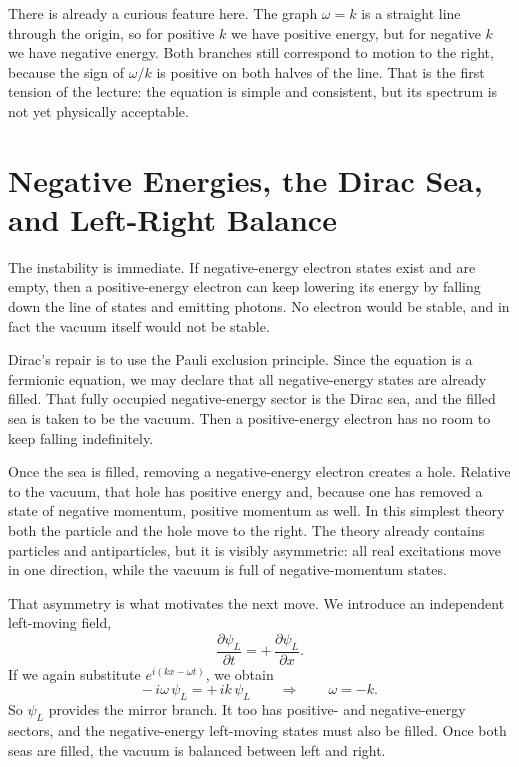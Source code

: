 There is already a curious feature here. The graph \(\omega=k\) is a straight line through the origin, so for positive \(k\) we have positive energy, but for negative \(k\) we have negative energy. Both branches still correspond to motion to the right, because the sign of \(\omega/k\) is positive on both halves of the line. That is the first tension of the lecture: the equation is simple and consistent, but its spectrum is not yet physically acceptable.

\section{Negative Energies, the Dirac Sea, and Left-Right Balance}

The instability is immediate. If negative-energy electron states exist and are empty, then a positive-energy electron can keep lowering its energy by falling down the line of states and emitting photons. No electron would be stable, and in fact the vacuum itself would not be stable.

Dirac's repair is to use the Pauli exclusion principle. Since the equation is a fermionic equation, we may declare that all negative-energy states are already filled. That fully occupied negative-energy sector is the Dirac sea, and the filled sea is taken to be the vacuum. Then a positive-energy electron has no room to keep falling indefinitely.

Once the sea is filled, removing a negative-energy electron creates a hole. Relative to the vacuum, that hole has positive energy and, because one has removed a state of negative momentum, positive momentum as well. In this simplest theory both the particle and the hole move to the right. The theory already contains particles and antiparticles, but it is visibly asymmetric: all real excitations move in one direction, while the vacuum is full of negative-momentum states.

That asymmetry is what motivates the next move. We introduce an independent left-moving field,
\begin{equation}
\frac{\partial \psi_L}{\partial t}=+\,\frac{\partial \psi_L}{\partial x}.
\end{equation}
If we again substitute \(e^{i(kx-\omega t)}\), we obtain
\begin{equation}
-\,i\omega\,\psi_L = +\,ik\,\psi_L
\qquad \Longrightarrow \qquad
\omega=-k.
\end{equation}
So \(\psi_L\) provides the mirror branch. It too has positive- and negative-energy sectors, and the negative-energy left-moving states must also be filled. Once both seas are filled, the vacuum is balanced between left and right.

